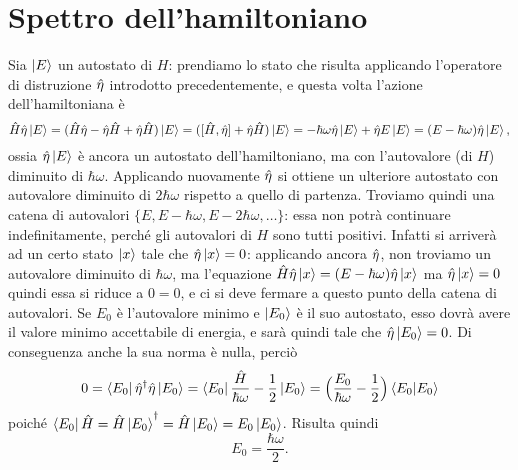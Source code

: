 \section{Spettro dell'hamiltoniano}
Sia $\left|{E}\right\rangle$ un autostato di $H$: prendiamo lo stato che risulta applicando l'operatore di distruzione $\hat{\eta}$ introdotto precedentemente, e questa volta l'azione dell'hamiltoniana è
\begin{equation}
	\hat{H}\hat{\eta}\left|{E}\right\rangle=(\hat{H}\hat{\eta}-\hat{\eta}\hat{H}+\hat{\eta}\hat{H})\left|{E}\right\rangle=([\hat{H},\hat{\eta}]+\hat{\eta}\hat{H})\left|{E}\right\rangle=-\hbar\omega\hat{\eta}\left|{E}\right\rangle+\hat{\eta} E\left|{E}\right\rangle=(E-\hbar\omega)\hat{\eta}\left|{E}\right\rangle,
\end{equation}
ossia $\hat{\eta}\left|{E}\right\rangle$ è ancora un autostato dell'hamiltoniano, ma con l'autovalore (di $H$) diminuito di $\hbar\omega$.
Applicando nuovamente $\hat{\eta}$ si ottiene un ulteriore autostato con autovalore diminuito di $2\hbar\omega$ rispetto a quello di partenza.
Troviamo quindi una catena di autovalori $\{E,E-\hbar\omega,E-2\hbar\omega,\dots\}$: essa non potrà continuare indefinitamente, perch\'e gli autovalori di $H$ sono tutti positivi.
Infatti si arriverà ad un certo stato $\left|{x}\right\rangle$ tale che $\hat{\eta}\left|{x}\right\rangle=0$: applicando ancora $\hat{\eta}$, non troviamo un autovalore diminuito di $\hbar\omega$, ma l'equazione	$\hat{H}\hat{\eta}\left|{x}\right\rangle=(E-\hbar\omega)\hat{\eta}\left|{x}\right\rangle$ ma $\hat{\eta}\left|{x}\right\rangle=0$ quindi essa si riduce a $0=0$, e ci si deve fermare a questo punto della catena di autovalori.
Se $E_0$ è l'autovalore minimo e $\left|{E_0}\right\rangle$ è il suo autostato, esso dovrà avere il valore minimo accettabile di energia, e sarà quindi tale che $\hat{\eta}\left|{E_0}\right\rangle=0$.
Di conseguenza anche la sua norma è nulla, perciò
\begin{equation}
	0=\left\langle{E_0}\right|{\hat{\eta}}^\dagger\hat{\eta}\left|{E_0}\right\rangle=\left\langle{E_0}\right|\frac{\hat{H}}{\hbar\omega}-\frac12\left|{E_0}\right\rangle=\Big(\frac{E_0}{\hbar\omega}-\frac12\Big)\left\langle{E_0}\middle|{E_0}\right\rangle
\end{equation}
poich\'e $\left\langle{E_0}\right|\hat{H}={\hat{H}\left|{E_0}\right\rangle}^\dagger=\hat{H}\left|{E_0}\right\rangle=E_0\left|{E_0}\right\rangle$.
Risulta quindi
\begin{equation}
	E_0=\frac{\hbar\omega}2.
	\label{eq:oscillatore-armonico-energia-minima}
\end{equation}

